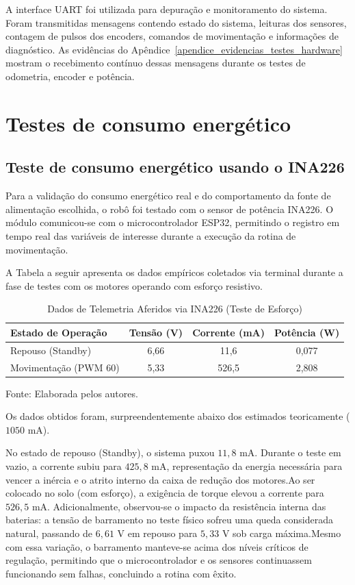 A interface UART foi utilizada para depuração e monitoramento do sistema. Foram
transmitidas mensagens contendo estado do sistema, leituras dos sensores,
contagem de pulsos dos encoders, comandos de movimentação e informações de
diagnóstico. As evidências do Apêndice~\ref{apendice_evidencias_testes_hardware}
mostram o recebimento contínuo dessas mensagens durante os testes de odometria,
encoder e potência.

\section{Testes de consumo energético}
\subsection{Teste de consumo energético usando o INA226}
Para a validação do consumo energético real e do comportamento da fonte de alimentação escolhida, o robô foi testado com o sensor de potência INA226. O módulo comunicou-se com o microcontrolador ESP32, permitindo o registro em tempo real das variáveis de interesse durante a execução da rotina de movimentação.

A Tabela a seguir apresenta os dados empíricos coletados via terminal durante a fase de testes com os motores operando com esforço resistivo.

\begin{table}[hbt!]
    \centering
    \caption{Dados de Telemetria Aferidos via INA226 (Teste de Esforço)}
    \label{tab:dados_ina226_real}
    \vspace{0.2cm}
    \begin{tabular}{lccc}
        \hline
        \textbf{Estado de Operação} & \textbf{Tensão (V)} & \textbf{Corrente (mA)} & \textbf{Potência (W)} \\ 
        \hline
        Repouso (Standby) & 6,66 & 11,6 & 0,077 \\
        Movimentação (PWM 60) & 5,33 & 526,5 & 2,808 \\
        \hline
    \end{tabular}
    \par\vspace{0.2cm}
    Fonte: Elaborada pelos autores.
\end{table}

Os dados obtidos foram, surpreendentemente abaixo dos estimados teoricamente ($1050$ mA).

No estado de repouso (Standby), o sistema puxou $11,8$ mA. Durante o teste em vazio, a corrente subiu para $425,8$ mA, representação da energia necessária  para vencer a inércia e o atrito interno da caixa de redução dos motores.Ao ser colocado no solo (com esforço), a exigência de torque elevou a corrente para $526,5$ mA. Adicionalmente, observou-se o impacto da resistência interna das baterias: a tensão de barramento no teste físico sofreu uma queda considerada natural, passando de $6,61$ V em repouso para $5,33$ V sob carga máxima.Mesmo com essa variação, o barramento manteve-se acima dos níveis críticos de regulação, permitindo que o microcontrolador e os sensores continuassem funcionando sem falhas, concluindo a rotina com êxito.

